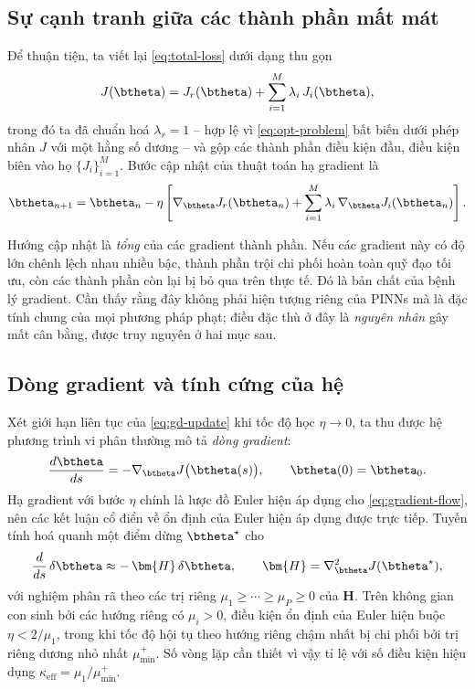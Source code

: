 \subsection{Sự cạnh tranh giữa các thành phần mất mát}
\label{subsec:canh-tranh}
 
Để thuận tiện, ta viết lại \eqref{eq:total-loss} dưới dạng thu gọn
\begin{equation}
J(\btheta)
= J_{r}(\btheta)
+ \sum_{i=1}^{M} \lambda_{i}\, J_{i}(\btheta),
\label{eq:loss-compact}
\end{equation}
trong đó ta đã chuẩn hoá $\lambda_{r} = 1$ -- hợp lệ vì \eqref{eq:opt-problem}
bất biến dưới phép nhân $J$ với một hằng số dương -- và gộp các thành phần điều
kiện đầu, điều kiện biên vào họ $\{J_{i}\}_{i=1}^{M}$. Bước cập nhật của thuật
toán hạ gradient là
\begin{equation}
\btheta_{n+1}
= \btheta_{n}
- \eta \left[
    \nabla_{\btheta} J_{r}(\btheta_{n})
    + \sum_{i=1}^{M} \lambda_{i}\, \nabla_{\btheta} J_{i}(\btheta_{n})
  \right].
\label{eq:gd-update}
\end{equation}
 
Hướng cập nhật là \emph{tổng} của các gradient thành phần. Nếu các gradient này
có độ lớn chênh lệch nhau nhiều bậc, thành phần trội chi phối hoàn toàn quỹ đạo
tối ưu, còn các thành phần còn lại bị bỏ qua trên thực tế. Đó là bản chất của
bệnh lý gradient. Cần thấy rằng đây không phải hiện tượng riêng của PINNs mà là
đặc tính chung của mọi phương pháp phạt; điều đặc thù ở đây là \emph{nguyên nhân}
gây mất cân bằng, được truy nguyên ở hai mục sau.
 
\subsection{Dòng gradient và tính cứng của hệ}
\label{subsec:dong-gradient}
 
Xét giới hạn liên tục của \eqref{eq:gd-update} khi tốc độ học $\eta \to 0$, ta
thu được hệ phương trình vi phân thường mô tả \emph{dòng gradient}:
\begin{equation}
\frac{d\btheta}{ds} = -\nabla_{\btheta} J\big(\btheta(s)\big),
\qquad \btheta(0) = \btheta_{0}.
\label{eq:gradient-flow}
\end{equation}
Hạ gradient với bước $\eta$ chính là lược đồ Euler hiện áp dụng cho
\eqref{eq:gradient-flow}, nên các kết luận cổ điển về ổn định của Euler hiện áp
dụng được trực tiếp. Tuyến tính hoá quanh một điểm dừng $\btheta^{\star}$ cho
\begin{equation}
\frac{d}{ds}\,\delta\btheta
\approx -\, \bm{H}\, \delta\btheta,
\qquad
\bm{H} = \nabla^{2}_{\btheta} J(\btheta^{\star}),
\label{eq:linearized-flow}
\end{equation}
với nghiệm phân rã theo các trị riêng $\mu_{1} \ge \cdots \ge \mu_{P} \ge 0$ của
$\bm{H}$. Trên không gian con sinh bởi các hướng riêng có $\mu_i > 0$, điều kiện
ổn định của Euler hiện buộc $\eta < 2/\mu_{1}$, trong khi tốc độ hội tụ theo
hướng riêng chậm nhất bị chi phối bởi trị riêng dương nhỏ nhất $\mu_{\min}^{+}$.
Số vòng lặp cần thiết vì vậy tỉ lệ với số điều kiện hiệu dụng
$\kappa_{\mathrm{eff}} = \mu_{1}/\mu_{\min}^{+}$.
 
